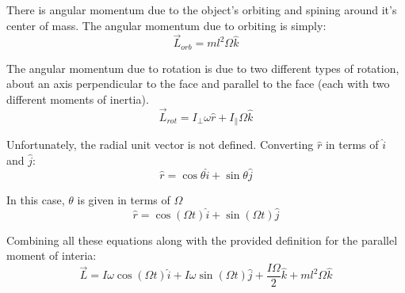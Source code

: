 \documentclass{article}
\begin{document}
There is angular momentum due to the object's orbiting and spining around it's
center of mass. The angular momentum due to orbiting is simply:
$$ \vec{ L }_{orb} = ml^{2}\Omega \hat{ k } $$

The angular momentum due to rotation is due to two different types of rotation,
about an axis perpendicular to the face and parallel to the face (each with two
different moments of inertia).
$$ \vec{ L }_{rot} = I_{\perp} \omega \hat{ r } + I_{\parallel} \Omega \hat{ k } $$

Unfortunately, the radial unit vector is not defined. Converting $\hat{ r }$ in
terms of $\hat{ i }$ and $\hat{ j }$:
$$ \hat{ r } = \cos \theta \hat{ i } + \sin{ \theta } \hat{ j } $$

In this case, $\theta$ is given in terms of $\Omega$
$$ \hat{ r } = \cos ( \Omega t ) \hat{ i } + \sin( \Omega t ) \hat{ j } $$

Combining all these equations along with the provided definition for the
parallel moment of interia:
$$ \vec{ L } = I \omega \cos( \Omega t ) \hat{ i } + I \omega \sin( \Omega t )
\hat{ j } + \frac{ I \Omega }{ 2 } \hat{ k } + ml^{2} \Omega \hat{ k }$$
\end{document}
